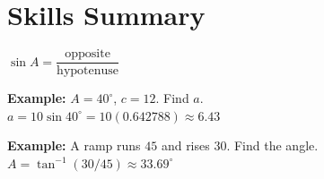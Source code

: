 \documentclass[12pt]{article}
\newcommand{\ans}[1]{\boldsymbol{#1}}
\begin{document}
\section*{Skills Summary}

\begin{formulabox}
$\sin A = \dfrac{\text{opposite}}{\text{hypotenuse}}$
\end{formulabox}

\begin{examplebox}
\textbf{Example:} $A = 40^\circ$, $c = 12$. Find $a$.\\
$a = 10\sin 40^\circ = 10(0.642788) \approx \ans{6.43}$
\end{examplebox}

\begin{examplebox}
\textbf{Example:} A ramp runs $45$ and rises $30$. Find the angle.\\
$A = \tan^{-1}(30/45) \approx \ans{33.69^\circ}$
\end{examplebox}
\end{document}
